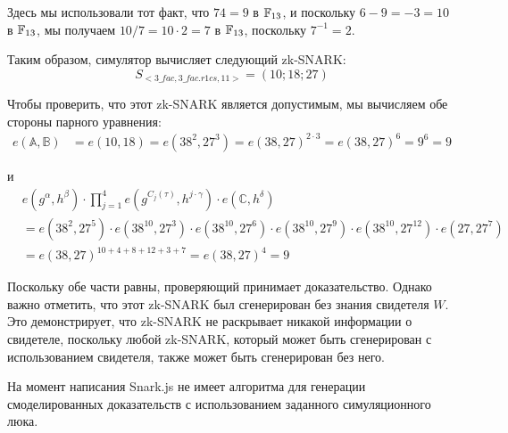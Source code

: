 Здесь мы использовали тот факт, что $74 = 9$ в $\mathbb{F}_{13}$, и поскольку $6-9 = -3 = 10$ в $\mathbb{F}_{13}$, мы получаем $10/7 = 10\cdot 2 = 7$ в $\mathbb{F}_{13}$, поскольку $7^{-1}=2$.

Таким образом, симулятор вычисляет следующий zk-SNARK:
\begin{equation}
S_{<3\_fac,3\_fac.r1cs,11>} = (10; 18; 27)
\end{equation}

Чтобы проверить, что этот zk-SNARK является допустимым, мы вычисляем обе стороны парного уравнения:
\begin{align*}
e(\mathbb{A},\mathbb{B}) & = e(10,18) = e(38^2,27^3) = e(38,27)^{2\cdot 3} = e(38,27)^6 = 9^6 = 9
\end{align*}

и
\begin{align*}
& e(g^{\alpha},h^{\beta}) \cdot \prod_{j=1}^{4} e(g^{C_j(\tau)},h^{j\cdot \gamma}) \cdot e(\mathbb{C},h^{\delta})\\
& = e(38^2,27^5) \cdot e(38^{10},27^{3})\cdot e(38^{10},27^{6})\cdot e(38^{10},27^{9})\cdot e(38^{10},27^{12}) \cdot e(27,27^7)\\
& = e(38,27)^{10 + 4 + 8 + 12 + 3 + 7} = e(38,27)^{4} = 9
\end{align*}

Поскольку обе части равны, проверяющий принимает доказательство. Однако важно отметить, что этот zk-SNARK был сгенерирован без знания свидетеля $W$. Это демонстрирует, что zk-SNARK не раскрывает никакой информации о свидетеле, поскольку любой zk-SNARK, который может быть сгенерирован с использованием свидетеля, также может быть сгенерирован без него.

\begin{example}
\label{ex:3-fac-groth-16-simulator-circom} На момент написания Snark.js не имеет алгоритма для генерации смоделированных доказательств с использованием заданного симуляционного люка.
\end{example}



